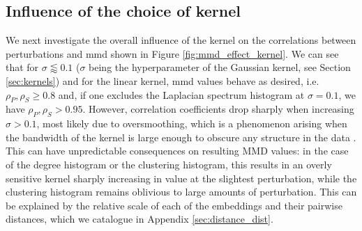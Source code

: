 \subsection{Influence of the choice of kernel} We next investigate the overall
influence of the kernel on the correlations between perturbations and
\acrshort{mmd} shown in Figure \ref{fig:mmd_effect_kernel}. We can see that for
$\sigma\lessapprox 0.1$ ($\sigma$ being the hyperparameter of the Gaussian
kernel, see Section \ref{sec:kernels}) and for the linear kernel, \acrshort{mmd}
values behave as desired, i.e. $\rho_P, \rho_S\geq 0.8$ and, if one excludes the
Laplacian spectrum histogram at $\sigma=0.1$, we have $\rho_P,\rho_S>0.95$.
However, correlation coefficients drop sharply when increasing $\sigma>0.1$,
most likely due to oversmoothing, which is a phenomenon arising when the
bandwidth of the kernel is large enough to obscure any structure in the data
\citep{hwang1994nonparametric}. This can have unpredictable consequences on
resulting MMD values: in the case of the degree histogram or the clustering
histogram, this results in an overly sensitive kernel sharply increasing in
value at the slightest perturbation, while the clustering histogram remains
oblivious to large amounts of perturbation. This can be explained by the
relative scale of each of the embeddings and their pairwise distances, which we
catalogue in Appendix \ref{sec:distance_dist}. %

